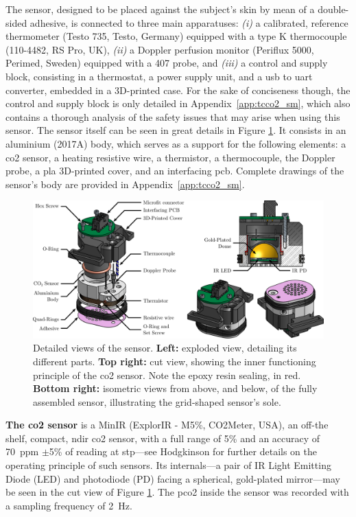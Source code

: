 The sensor, designed to be placed against the subject's skin by mean of a double-sided adhesive, is connected to three main apparatuses: \textit{(i)} a calibrated, reference thermometer (Testo 735, Testo, Germany) equipped with a type K thermocouple (110-4482, RS Pro, UK), \textit{(ii)} a Doppler perfusion monitor (Periflux 5000, Perimed, Sweden) equipped with a 407 probe, and \textit{(iii)} a control and supply block, consisting in a thermostat, a power supply unit, and a \gls{usb} to \gls{uart} converter, embedded in a 3D-printed case. For the sake of conciseness though, the control and supply block is only detailed in Appendix~\ref{app:tcco2_sm}, which also contains a thorough analysis of the safety issues that may arise when using this sensor. The sensor itself can be seen in great details in Figure \ref{fig:tcco2:explo_cut}. It consists in an aluminium (2017A) body, which serves as a support for the following elements: a \gls{co2} sensor, a heating resistive wire, a thermistor, a thermocouple, the Doppler probe, a \gls{pla} 3D-printed cover, and an interfacing \gls{pcb}. Complete drawings of the sensor's body are provided in Appendix~\ref{app:tcco2_sm}.

\begin{figure}
	\centering
	\includegraphics[width=\linewidth]{1_main_matter/tcco2_figures//explo_cut.pdf}
	\caption[Detailed views of the sensor.]{Detailed views of the sensor. \textbf{Left:} exploded view, detailing its different parts. \textbf{Top right:} cut view, showing the inner functioning principle of the \gls{co2} sensor. Note the epoxy resin sealing, in red. \textbf{Bottom right:} isometric views from above, and below, of the fully assembled sensor, illustrating the grid-shaped sensor's sole.}\label{fig:tcco2:explo_cut}
\end{figure}

\textbf{The \gls{co2} sensor} is a MinIR (ExplorIR - M5\%, CO2Meter, USA), an off-the shelf, compact, \gls{ndir} \gls{co2} sensor, with a full range of 5\% and an accuracy of 70~ppm $\pm$5\% of reading at \gls{stp}---see Hodgkinson \etal{}\cite{hodgkinson2012rev} for further details on the operating principle of such sensors. Its internals---a pair of IR Light Emitting Diode (LED) and photodiode (PD) facing a spherical, gold-plated mirror---may be seen in the cut view of Figure \ref{fig:tcco2:explo_cut}. The \gls{pco2} inside the sensor was recorded with a sampling frequency of 2~Hz.

